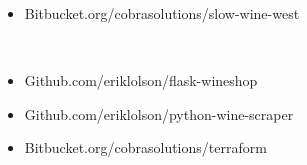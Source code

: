 \documentclass[
    10pt,
    A4,
    english,
    draft = false,
    twoside = false,
]{article}
\begin{document}
	{
	{\fontsize{12}{0}\selectfont
    \begin{itemize}
      \item Bitbucket.org/cobrasolutions/slow-wine-west 
    \end{itemize}
    }}\\
	{
	{\fontsize{12}{0}\selectfont
    \begin{itemize}
    \itemsep1em 
      \item Github.com/eriklolson/flask-wineshop
       \item Github.com/eriklolson/python-wine-scraper
        \item Bitbucket.org/cobrasolutions/terraform
    \end{itemize}
    }}




\end{document}
